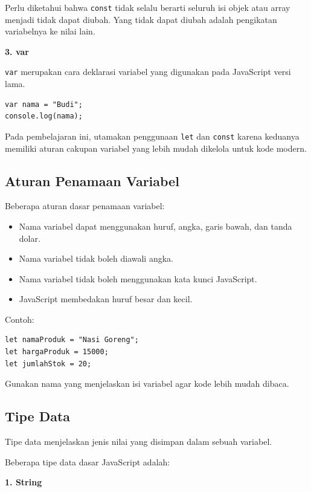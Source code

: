\documentclass[12pt,a4paper]{article}
\begin{document}
Perlu diketahui bahwa \texttt{const} tidak selalu
berarti seluruh isi objek atau array menjadi
tidak dapat diubah. Yang tidak dapat diubah adalah
pengikatan variabelnya ke nilai lain.

\textbf{3. var}

\texttt{var} merupakan cara deklarasi variabel
yang digunakan pada JavaScript versi lama.

\begin{lstlisting}
var nama = "Budi";
console.log(nama);
\end{lstlisting}

Pada pembelajaran ini, utamakan penggunaan
\texttt{let} dan \texttt{const} karena keduanya
memiliki aturan cakupan variabel yang lebih mudah
dikelola untuk kode modern.

\subsection{Aturan Penamaan Variabel}

Beberapa aturan dasar penamaan variabel:

\begin{itemize}
    \item Nama variabel dapat menggunakan huruf,
    angka, garis bawah, dan tanda dolar.
    \item Nama variabel tidak boleh diawali angka.
    \item Nama variabel tidak boleh menggunakan
    kata kunci JavaScript.
    \item JavaScript membedakan huruf besar dan kecil.
\end{itemize}

Contoh:

\begin{lstlisting}
let namaProduk = "Nasi Goreng";
let hargaProduk = 15000;
let jumlahStok = 20;
\end{lstlisting}

Gunakan nama yang menjelaskan isi variabel agar
kode lebih mudah dibaca.

\subsection{Tipe Data}

Tipe data menjelaskan jenis nilai yang disimpan
dalam sebuah variabel.

Beberapa tipe data dasar JavaScript adalah:

\textbf{1. String}
\end{document}
